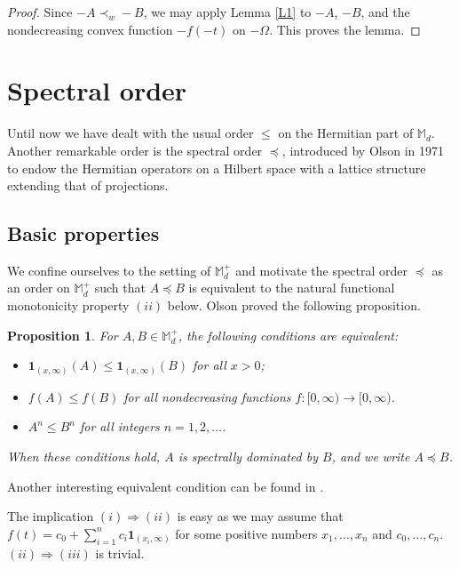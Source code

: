 \documentclass[12pt,reqno]{article}
\newtheorem{prop}[theorem]{Proposition}
\theoremstyle{definition}
\theoremstyle{remark}
\numberwithin{equation}{section}
\def\ind{\mathbf{1}}
\def\bM{\mathbb{M}}
\begin{document}
\begin{proof} Since $-A\prec_w -B$, we may apply Lemma \ref{L1} to $-A$, $-B$, and the nondecreasing convex function $-f(-t)$ on $-\Omega$.
This proves the lemma.
\end{proof}


\section{Spectral order}

Until now we have dealt with the usual order $\le$ on the Hermitian part of $\bM_d$. Another remarkable order is the spectral order $\preceq$, introduced by Olson in 1971 \cite{Ols} to endow the Hermitian operators on a Hilbert space with a lattice structure extending that of projections.

\subsection{Basic properties }

We confine ourselves to the setting of $\bM_d^+$ and   motivate the spectral order $\preceq$ as an order on $\bM_d^+$  such that $A\preceq B$ is equivalent  to the natural functional monotonicity property $(ii)$ below. Olson proved the following proposition.


\begin{prop}\label{OO}
 For  $A,B\in\bM_d^+$, the following conditions are equivalent:
\begin{itemize}
\item[($i$)] $\ind_{(x,\infty)}(A) \le  \ind_{(x,\infty)}(B)$ for all $x> 0$;
\item[($ii$)] $f(A)\le f(B)$ for all nondecreasing functions $f:[0,\infty)\to[0,\infty)$.
\item[($iii$)] $A^n\le B^n$ for all integers $n=1,2,\ldots$.
\end{itemize}
When these conditions hold, $A$ is spectrally dominated by $B$, and we write $A\preceq B$.
\end{prop}

\vskip 5pt
Another interesting equivalent condition can be found in \cite{HJS}. 

The implication 
$(i)\Rightarrow(ii)$ is easy as we may assume that $f(t)=c_0+\sum_{i=1}^n c_i\ind_{(x_i,\infty)}$ for some positive numbers $x_1,\ldots, x_n$ and $c_0,\ldots, c_n$. $(ii)\Rightarrow(iii)$ is trivial.
\end{document}
